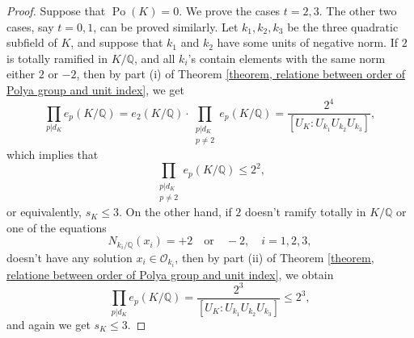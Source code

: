 \documentclass{jams-l}
\theoremstyle{definition}
\theoremstyle{remark}
\numberwithin{equation}{section}
\DeclareMathOperator{\Po}{Po}
\begin{document}
\begin{proof}
 Suppose that $\Po(K)=0$. We prove the cases $t=2,3$. The other two cases, say $t=0,1$, can be proved similarly. Let $k_1,k_2,k_3$ be the three quadratic subfield of $K$, and suppose that $k_1$ and $k_2$ have some units of negative norm. If $2$ is totally ramified in $K/\mathbb{Q}$, and all $k_i$'s contain elements with the same norm either $2$ or $-2$, then by part (i) of Theorem \ref{theorem, relatione between order of Polya group and unit index}, we get
\begin{equation*}
\prod_{p | d_K} e_p(K/\mathbb{Q})=e_2(K/\mathbb{Q}) \cdot \prod_{\substack{p | d_K\\ p \neq 2}} e_p(K/\mathbb{Q}) = \frac{2^4}{\left[U_K : U_{k_1} U_{k_2} U_{k_3}\right]},
\end{equation*}
which implies that 
\begin{equation*}
 \prod_{\substack{p | d_K\\ p \neq 2}} e_p(K/\mathbb{Q}) \leq 2^2,
\end{equation*}
or equivalently, $s_K \leq 3$. On the other hand, if $2$ doesn't ramify totally in $K/\mathbb{Q}$ or one of the equations
\begin{equation*}
N_{k_i/\mathbb{Q}}(x_i)=+2 \quad \text{or} \quad -2, \quad i=1,2,3,
\end{equation*}
doesn't have any solution $x_i \in \mathcal{O}_{k_i}$, then by part (ii) of Theorem \ref{theorem, relatione between order of Polya group and unit index}, we obtain
\begin{equation*}
	\prod_{p | d_K} e_p(K/\mathbb{Q}) = \frac{2^3}{\left[U_K : U_{k_1} U_{k_2} U_{k_3}\right]} \leq 2^3,
\end{equation*}
and again we get $s_K \leq 3$.
\end{proof}







\end{document}
